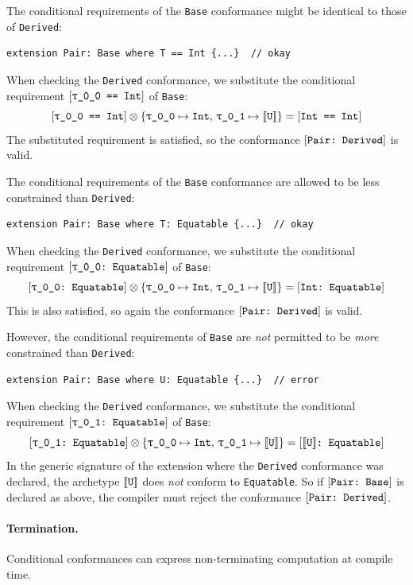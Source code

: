\documentclass[../generics]{subfiles}
\begin{document}
 The conditional requirements of the \texttt{Base} conformance might be identical to those of \texttt{Derived}:
\begin{Verbatim}
extension Pair: Base where T == Int {...}  // okay
\end{Verbatim}
When checking the \texttt{Derived} conformance, we substitute the conditional requirement $\SameReq{\rT}{Int}$ of \texttt{Base}:
\[\SameReq{\rT}{Int}\otimes \SubstMap{\SubstType{\rT}{Int},\,\SubstType{\rU}{$\archetype{U}$}}=\SameReq{Int}{Int}\]
The substituted requirement is satisfied, so the conformance $[\texttt{Pair:~Derived}]$ is valid.

 The conditional requirements of the \texttt{Base} conformance are allowed to be less  constrained than \texttt{Derived}:
\begin{Verbatim}
extension Pair: Base where T: Equatable {...}  // okay
\end{Verbatim}
When checking the \texttt{Derived} conformance, we substitute the conditional requirement $\ConfReq{\rT}{Equatable}$ of \texttt{Base}:
\[\ConfReq{\rT}{Equatable}\otimes\SubstMap{\SubstType{\rT}{Int},\,\SubstType{\rU}{$\archetype{U}$}}=\ConfReq{Int}{Equatable}\]
This is also satisfied, so again the conformance $[\texttt{Pair:~Derived}]$ is valid.

 However, the conditional requirements of \texttt{Base} are \emph{not} permitted to be \emph{more} constrained than \texttt{Derived}:
\begin{Verbatim}
extension Pair: Base where U: Equatable {...}  // error
\end{Verbatim}
When checking the \texttt{Derived} conformance, we substitute the conditional requirement $\ConfReq{\rU}{Equatable}$ of \texttt{Base}:
\[\ConfReq{\rU}{Equatable}\otimes \SubstMap{\SubstType{\rT}{Int},\,\SubstType{\rU}{$\archetype{U}$}}=\ConfReq{$\archetype{U}$}{Equatable}\]
In the generic signature of the extension where the \texttt{Derived} conformance was declared, the archetype $[\![\texttt{U}]\!]$ does \emph{not} conform to \texttt{Equatable}. So if $[\texttt{Pair:~Base}]$ is declared as above, the compiler must reject the conformance $[\texttt{Pair:~Derived}]$.

\paragraph{Termination.}
Conditional conformances can express non-terminating computation at compile time.
\end{document}
